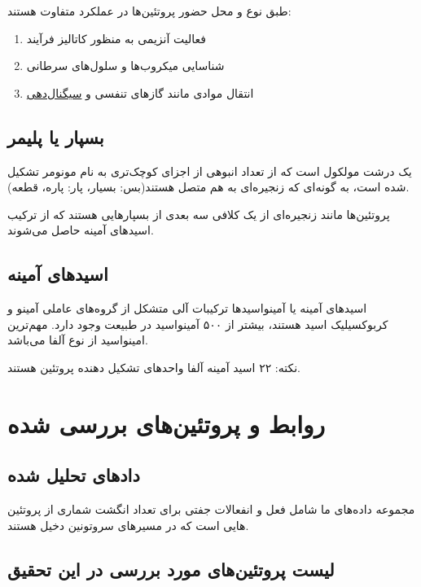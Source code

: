\documentclass[10pt, a4paper]{article}
\begin{document}
طبق نوع و محل حضور پروتئین‌ها در عملکرد متفاوت هستند:

\begin{enumerate}
    \item فعالیت آنزیمی به منظور کاتالیز فرآیند
    \item شناسایی میکروب‌ها و سلول‌های سرطانی
    \item انتقال موادی مانند گاز‌های تنفسی و \underline{سیگنال‌دهی}
\end{enumerate}

\subsection{بسپار یا پلیمر}

یک درشت مولکول است که از تعداد انبوهی از اجزای کوچک‌تری به نام مونومر تشکیل شده
است، به گونه‌ای که زنجیره‌ای به هم متصل هستند(بس: بسیار، پار: پاره، قطعه).

پروتئین‌ها مانند زنجیره‌ای از یک کلافی سه بعدی از بسپار‌هایی هستند که از ترکیب
اسید‌های آمینه حاصل می‌شوند.

\subsection{اسید‌های آمینه}

اسید‌های آمینه یا آمینواسید‌ها ترکیبات آلی متشکل از گروه‌های عاملی آمینو و
کربوکسیلیک اسید هستند، بیشتر از ۵۰۰ آمینواسید در طبیعت وجود دارد. مهم‌ترین
امینواسید از نوع آلفا می‌باشد.

نکته: ۲۲ اسید آمینه آلفا واحد‌های تشکیل دهنده پروتئین هستند.

\section{روابط و پروتئین‌های بررسی شده}

\subsection{دادهای تحلیل شده}

مجموعه داده‌های ما شامل فعل و انفعالات جفتی برای تعداد انگشت شماری از پروتئین
هایی است که در مسیرهای سروتونین دخیل هستند.

\subsection{لیست پروتئین‌های مورد بررسی در این تحقیق}
\end{document}
